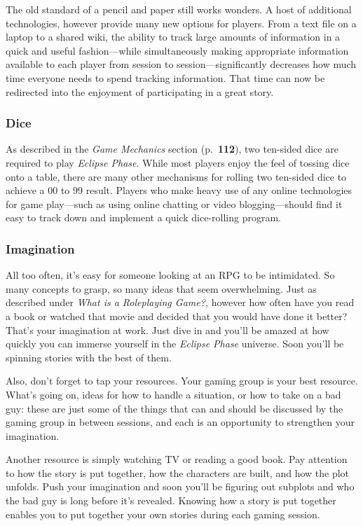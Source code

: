 The old standard of a pencil and paper still works 
wonders. A host of additional technologies, however
provide many new options for players. From
a text file on a laptop to a shared wiki, the ability 
to track large amounts of information in a quick 
and useful fashion—while simultaneously making 
appropriate information available to each player 
from session to session—significantly decreases 
how much time everyone needs to spend tracking 
information. That time can now be redirected into 
the enjoyment of participating in a great story.

\subsubsection{Dice}

As described in the \textit{Game Mechanics} section (p. \textbf{112}), 
two ten-sided dice are required to play \textit{Eclipse Phase}. 
While most players enjoy the feel of tossing dice onto 
a table, there are many other mechanisms for rolling 
two ten-sided dice to achieve a 00 to 99 result. Players 
who make heavy use of any online technologies for 
game play—such as using online chatting or video 
blogging—should find it easy to track down and 
implement a quick dice-rolling program.

\subsubsection{Imagination}

All too often, it's easy for someone looking at an 
RPG to be intimidated. So many concepts to grasp, 
so many ideas that seem overwhelming. Just as described
under \textit{What is a Roleplaying Game?,} however
how often have you read a book or watched
that movie and decided that you would have done 
it better? That's your imagination at work. Just dive 
in and you'll be amazed at how quickly you can immerse
yourself in the \textit{Eclipse Phase} universe. Soon
you'll be spinning stories with the best of them.

Also, don't forget to tap your resources. Your 
gaming group is your best resource. What's going on, 
ideas for how to handle a situation, or how to take 
on a bad guy: these are just some of the things that 
can and should be discussed by the gaming group 
in between sessions, and each is an opportunity to 
strengthen your imagination.

Another resource is simply watching TV or reading
a good book. Pay attention to how the story is
put together, how the characters are built, and how 
the plot unfolds. Push your imagination and soon 
you'll be figuring out subplots and who the bad guy 
is long before it's revealed. Knowing how a story is 
put together enables you to put together your own 
stories during each gaming session.

